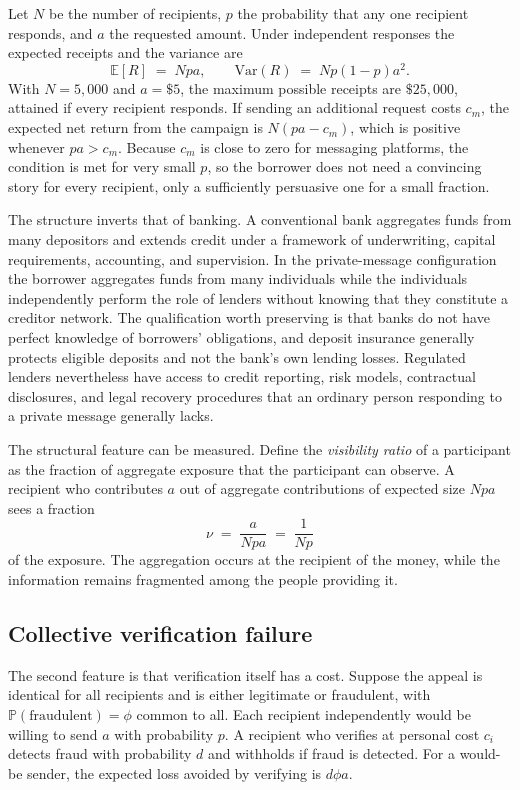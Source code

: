 \documentclass[11pt]{article}
\theoremstyle{definition}
\theoremstyle{remark}
\newcommand{\E}{\mathbb{E}}
\newcommand{\Prob}{\mathbb{P}}
\begin{document}
Let $N$ be the number of recipients, $p$ the probability that any one recipient responds, and $a$ the requested amount. Under independent responses the expected receipts and the variance are
\[
\E[R]\;=\;Npa,\qquad \mathrm{Var}(R)\;=\;Np(1-p)a^2 .
\]
With $N=5{,}000$ and $a=\$5$, the maximum possible receipts are $\$25{,}000$, attained if every recipient responds. If sending an additional request costs $c_m$, the expected net return from the campaign is $N(pa-c_m)$, which is positive whenever $pa>c_m$. Because $c_m$ is close to zero for messaging platforms, the condition is met for very small $p$, so the borrower does not need a convincing story for every recipient, only a sufficiently persuasive one for a small fraction.

The structure inverts that of banking. A conventional bank aggregates funds from many depositors and extends credit under a framework of underwriting, capital requirements, accounting, and supervision. In the private-message configuration the borrower aggregates funds from many individuals while the individuals independently perform the role of lenders without knowing that they constitute a creditor network. The qualification worth preserving is that banks do not have perfect knowledge of borrowers' obligations, and deposit insurance generally protects eligible deposits and not the bank's own lending losses. Regulated lenders nevertheless have access to credit reporting, risk models, contractual disclosures, and legal recovery procedures that an ordinary person responding to a private message generally lacks.

The structural feature can be measured. Define the \emph{visibility ratio} of a participant as the fraction of aggregate exposure that the participant can observe. A recipient who contributes $a$ out of aggregate contributions of expected size $Npa$ sees a fraction
\[
\nu \;=\; \frac{a}{Npa}\;=\;\frac{1}{Np}
\]
of the exposure. The aggregation occurs at the recipient of the money, while the information remains fragmented among the people providing it.

\subsection{Collective verification failure}

The second feature is that verification itself has a cost. Suppose the appeal is identical for all recipients and is either legitimate or fraudulent, with $\Prob(\text{fraudulent})=\phi$ common to all. Each recipient independently would be willing to send $a$ with probability $p$. A recipient who verifies at personal cost $c_i$ detects fraud with probability $d$ and withholds if fraud is detected. For a would-be sender, the expected loss avoided by verifying is $d\phi a$.
\end{document}
